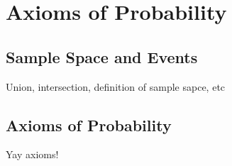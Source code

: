 \section{Axioms of Probability}
\subsection{Sample Space and Events}
Union, intersection, definition of sample sapce, etc
\subsection{Axioms of Probability}
Yay axioms!

